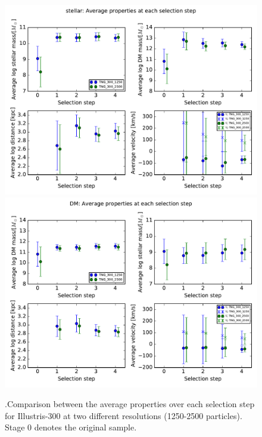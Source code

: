 \documentclass[fleqn,usenatbib]{mnras}
\begin{document}
\begin{figure}
\centering
\includegraphics[scale=0.4]{avgProp/stellar_avgPropsTNG_300_1250TNG_300_2500}
\includegraphics[scale=0.4]{avgProp/DM_avgPropsTNG_300_1250TNG_300_2500}
\caption{\label{fig:prop_300_300} .Comparison between the average properties over each selection step for Illustris-300 at two different resolutions (1250-2500 particles). Stage $0$ denotes the original sample.}
\end{figure}

 




\end{document}
